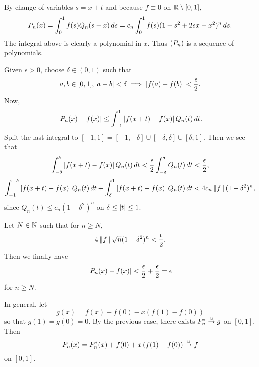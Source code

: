 By change of variables \(s = x + t\) and because \(f \equiv 0\) on \(\mathbb{R} \setminus [0, 1]\),
\[
    P_n(x) = \int_0^1 f(s) Q_n(s - x) \,d{s} = c_n \int_0^1 f(s)(1-s^2+2sx-x^2)^n \,d{s}.
\]
The integral above is clearly a polynomial in \(x\). Thus \(\left( P_n \right)\) is a sequence of polynomials.

Given \(\epsilon > 0\), choose \(\delta \in (0, 1)\) such that
\[
    a, b \in [0, 1], \left| a - b \right| < \delta \implies \left| f(a) - f(b) \right| < \frac{\epsilon}{2}.
\]
Now,
\[
    \left| P_n(x) - f(x) \right| \leq \int_{-1}^1 \left| f(x+t) - f(x) \right| Q_n(t)\,d{t}.
\]
Split the last integral to \([-1, 1] = [-1, -\delta] \cup [-\delta, \delta] \cup [\delta, 1]\). Then we see that
\[
    \int_{-\delta}^\delta \left| f(x+t) - f(x) \right| Q_n(t)\,d{t} < \frac{\epsilon}{2} \int_{-\delta}^\delta Q_n(t)\,d{t} < \frac{\epsilon}{2},
\]
\[
    \int_{-1}^{-\delta} \left| f(x+t) - f(x) \right| Q_n(t)\,d{t} + \int_{\delta}^1 \left| f(x+t) - f(x) \right| Q_n(t)\,d{t} < 4 c_n \left\lVert f \right\rVert (1-\delta^2)^n,
\]
since \(Q_n(t) \leq c_n(1-\delta^2)^n\) on \(\delta \leq \left| t \right| \leq 1\).

Let \(N \in \mathbb{N}\) such that for \(n \geq N\),
\[
    4 \left\lVert f \right\rVert \sqrt{n} (1-\delta^2)^n < \frac{\epsilon}{2}.
\]
Then we finally have
\[
    \left| P_n(x) - f(x) \right| < \frac{\epsilon}{2} + \frac{\epsilon}{2} = \epsilon
\]
for \(n \geq N\).

In general, let
\[
    g(x) = f(x) - f(0) - x\left(f(1) - f(0)\right)
\]
so that \(g(1) = g(0) = 0\). By the previous case, there exists \(P_n^\ast \overset{u}{\rightarrow} g\) on \([0, 1]\). Then
\[
    P_n(x) = P_n^\ast(x) + f(0) + x\left(f(1) - f(0)\right) \overset{u}{\rightarrow} f
\]
on \([0, 1]\).

\pagebreak
